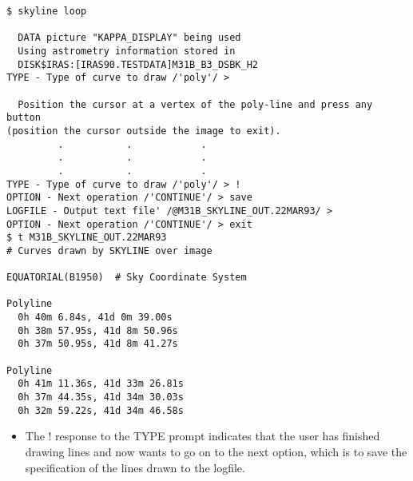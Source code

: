 \documentclass[twoside,11pt]{article}
\begin{document}
\begin{small}
\begin{verbatim}
$ skyline loop

  DATA picture "KAPPA_DISPLAY" being used
  Using astrometry information stored in
  DISK$IRAS:[IRAS90.TESTDATA]M31B_B3_DSBK_H2
TYPE - Type of curve to draw /'poly'/ > 

  Position the cursor at a vertex of the poly-line and press any button
(position the cursor outside the image to exit).
         .           .            .
         .           .            .
         .           .            .
TYPE - Type of curve to draw /'poly'/ > !
OPTION - Next operation /'CONTINUE'/ > save
LOGFILE - Output text file' /@M31B_SKYLINE_OUT.22MAR93/ > 
OPTION - Next operation /'CONTINUE'/ > exit
$ t M31B_SKYLINE_OUT.22MAR93
# Curves drawn by SKYLINE over image
 
EQUATORIAL(B1950)  # Sky Coordinate System
 
Polyline
  0h 40m 6.84s, 41d 0m 39.00s
  0h 38m 57.95s, 41d 8m 50.96s
  0h 37m 50.95s, 41d 8m 41.27s
 
Polyline
  0h 41m 11.36s, 41d 33m 26.81s
  0h 37m 44.35s, 41d 34m 30.03s
  0h 32m 59.22s, 41d 34m 46.58s
\end{verbatim}
\end{small}
\begin{itemize}
\item The ! response to the TYPE prompt indicates that the user has finished
drawing lines and now wants to go on to the next option, which is to save the
specification of the lines drawn to the logfile.
\end{itemize}
\end{document}
